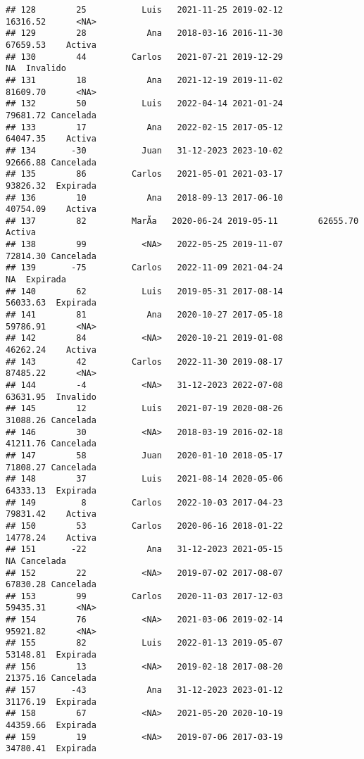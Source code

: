 \documentclass[
]{article}
\begin{document}
\begin{verbatim}
## 128        25           Luis   2021-11-25 2019-02-12        16316.52      <NA>
## 129        28            Ana   2018-03-16 2016-11-30        67659.53    Activa
## 130        44         Carlos   2021-07-21 2019-12-29              NA  Invalido
## 131        18            Ana   2021-12-19 2019-11-02        81609.70      <NA>
## 132        50           Luis   2022-04-14 2021-01-24        79681.72 Cancelada
## 133        17            Ana   2022-02-15 2017-05-12        64047.35    Activa
## 134       -30           Juan   31-12-2023 2023-10-02        92666.88 Cancelada
## 135        86         Carlos   2021-05-01 2021-03-17        93826.32  Expirada
## 136        10            Ana   2018-09-13 2017-06-10        40754.09    Activa
## 137        82         MarÃ­a   2020-06-24 2019-05-11        62655.70    Activa
## 138        99           <NA>   2022-05-25 2019-11-07        72814.30 Cancelada
## 139       -75         Carlos   2022-11-09 2021-04-24              NA  Expirada
## 140        62           Luis   2019-05-31 2017-08-14        56033.63  Expirada
## 141        81            Ana   2020-10-27 2017-05-18        59786.91      <NA>
## 142        84           <NA>   2020-10-21 2019-01-08        46262.24    Activa
## 143        42         Carlos   2022-11-30 2019-08-17        87485.22      <NA>
## 144        -4           <NA>   31-12-2023 2022-07-08        63631.95  Invalido
## 145        12           Luis   2021-07-19 2020-08-26        31088.26 Cancelada
## 146        30           <NA>   2018-03-19 2016-02-18        41211.76 Cancelada
## 147        58           Juan   2020-01-10 2018-05-17        71808.27 Cancelada
## 148        37           Luis   2021-08-14 2020-05-06        64333.13  Expirada
## 149         8         Carlos   2022-10-03 2017-04-23        79831.42    Activa
## 150        53         Carlos   2020-06-16 2018-01-22        14778.24    Activa
## 151       -22            Ana   31-12-2023 2021-05-15              NA Cancelada
## 152        22           <NA>   2019-07-02 2017-08-07        67830.28 Cancelada
## 153        99         Carlos   2020-11-03 2017-12-03        59435.31      <NA>
## 154        76           <NA>   2021-03-06 2019-02-14        95921.82      <NA>
## 155        82           Luis   2022-01-13 2019-05-07        53148.81  Expirada
## 156        13           <NA>   2019-02-18 2017-08-20        21375.16 Cancelada
## 157       -43            Ana   31-12-2023 2023-01-12        31176.19  Expirada
## 158        67           <NA>   2021-05-20 2020-10-19        44359.66  Expirada
## 159        19           <NA>   2019-07-06 2017-03-19        34780.41  Expirada
\end{verbatim}
\end{document}
